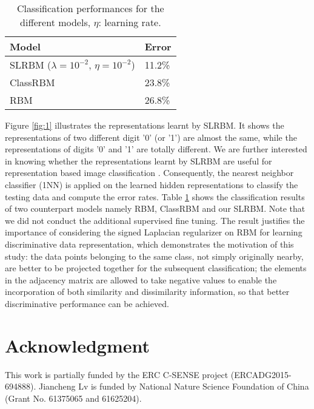 \documentclass[a4paper,10pt,twocolumn]{article}
\begin{document}
\begin{table}[h]
 \centering
  \fontsize{8.4}{10.5}\selectfont%
\begin{tabular}{l|l }
Model          & Error  \\\hline
SLRBM ($\lambda = 10^{-2}$, $\eta = 10^{-2}$)     & 11.2\%\\\hline
ClassRBM & 23.8\%\\
RBM & 26.8\%\\
\end{tabular}
  \caption{Classification performances for the different models, $\eta$: learning rate.}\label{tab:results}
\end{table}

Figure \ref{fig:1} illustrates the representations learnt by SLRBM. It shows the representations of two different digit '0' (or '1') are almost the same, while the representations of digits '0' and '1' are totally different. We are further interested in knowing whether the representations learnt by SLRBM are useful for representation based image classification \cite{vidal2011subspace}. Consequently, the nearest neighbor classifier (1NN) is applied on the learned hidden representations to classify the testing data and compute the error rates. Table \ref{tab:results} shows the classification results of two counterpart models namely RBM, ClassRBM \cite{larochelle2012learning} and our SLRBM. Note that we did not conduct the additional supervised fine tuning. The result justifies the importance of considering the signed Laplacian regularizer on RBM for learning discriminative data representation, which demonstrates the motivation of this study: the data points belonging to the same class, not simply originally nearby, are better to be projected together for the subsequent classification; the elements in the adjacency matrix are allowed to take negative values to enable the incorporation of both similarity and dissimilarity information, so that better discriminative performance can be achieved.


\section*{Acknowledgment}
This work is partially funded by the ERC C-SENSE project (ERCADG2015-694888). Jiancheng Lv is funded by National Nature Science Foundation of China (Grant No. 61375065 and 61625204).




\end{document}
